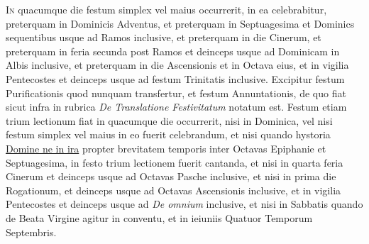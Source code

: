 \begin{multicols*}{2}
{\color{Red} }
\lettrine[lines=2]{\zallmancaps \color{Red} I}{n} quacumque die festum simplex vel maius occurrerit, in ea celebrabitur, preterquam in Dominicis Adventus, et preterquam in Septuagesima et Dominics sequentibus usque ad Ramos inclusive, et preterquam in die Cinerum, et preterquam in feria secunda post Ramos et deinceps usque ad Dominicam in Albis inclusive, et preterquam in die Ascensionis et in Octava eius, et in vigilia Pentecostes et deinceps usque ad festum Trinitatis inclusive. Excipitur festum Purificationis quod nunquam transfertur, et festum Annuntationis, de quo fiat sicut infra in rubrica \textit{De Translatione Festivitatum} notatum est.
Festum etiam trium lectionum fiat in quacumque die occurrerit, nisi in Dominica, vel nisi festum simplex vel maius in eo fuerit celebrandum, et nisi quando hystoria \hyperlink{domine-ne-in-ira}{Domine ne in ira} propter brevitatem temporis inter Octavas Epiphanie et Septuagesima, in festo trium lectionem fuerit cantanda, et nisi in quarta feria Cinerum et deinceps usque ad Octavas Pasche inclusive, et nisi in prima die Rogationum, et deinceps usque ad Octavas Ascensionis inclusive, et in vigilia Pentecostes et deinceps usque ad \textit{De omnium} inclusive, et nisi in Sabbatis quando de Beata Virgine agitur in conventu, et in ieiuniis Quatuor Temporum Septembris.


\end{multicols*}
